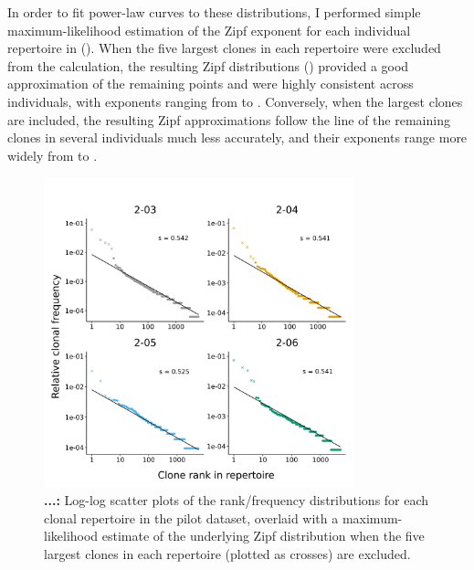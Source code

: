 In order to fit power-law curves to these distributions, I performed simple maximum-likelihood estimation of the Zipf exponent for each individual repertoire in  (). When the five largest clones in each repertoire were excluded from the calculation, the resulting Zipf distributions () provided a good approximation of the remaining points and were highly consistent across individuals, with exponents ranging from  to . Conversely, when the largest clones are included, the resulting Zipf approximations follow the line of the remaining clones in several individuals much less accurately, and their exponents range more widely from  to .

\begin{figure}
\centering
\includegraphics[width=0.8\textwidth]{_Figures/png/pilot-clones-zipf-fit}
\caption[...]{\textbf{...:} Log-log scatter plots of the rank/frequency distributions for each clonal repertoire in the pilot dataset, overlaid with a maximum-likelihood estimate of the underlying Zipf distribution when the five largest clones in each repertoire (plotted as crosses) are excluded.}
\label{fig:igseq-pilot-clones-zipf-fit}
\end{figure} %

